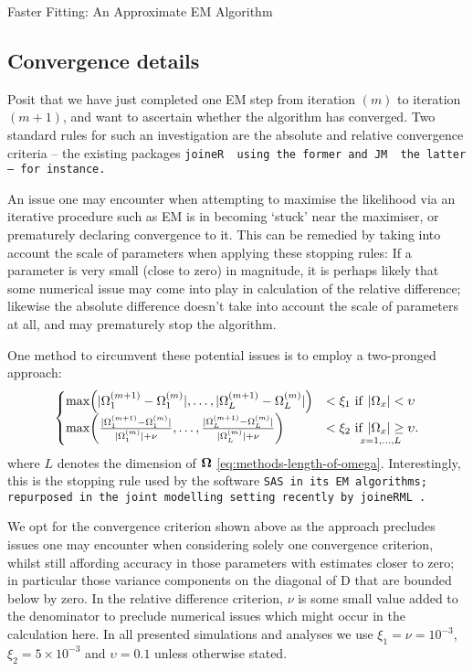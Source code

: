 \begin{chapter}{\label{cha:approx}Faster Fitting: An Approximate EM Algorithm}
  \subsection{Convergence details}\label{sec:approx-convcrit}
  Posit that we have just completed one EM step from iteration $(m)$ to iteration $(m+1)$, and want to ascertain whether the algorithm has converged. Two standard rules for such an investigation are the absolute and relative convergence criteria -- the existing packages \tt{joineR} \citep{R-joineR} using the former and \tt{JM} \citep{R-JM} the latter -- for instance. 
  
  An issue one may encounter when attempting to maximise the likelihood via an iterative procedure such as EM is in becoming `stuck' near the maximiser, or prematurely declaring convergence to it. This can be remedied by taking into account the scale of parameters when applying these stopping rules: If a parameter is very small (\ie close to zero) in magnitude, it is perhaps likely that some numerical issue may come into play in calculation of the relative difference; likewise the absolute difference doesn't take into account the scale of parameters at all, and may prematurely stop the algorithm.

  One method to circumvent these potential issues is to employ a two-pronged approach: 
  \begin{align}
    \begin{cases}
        \max\lb|\tobmp{\Omega}_1-\tobm{\Omega}_1|,\dots,|\tobmp{\Omega}_L-\tobm{\Omega}_L|\rb&<\xi_1\ \mathrm{if}\ |\Omega_x| < \upsilon \\
        \max\lb\frac{|\tobmp{\Omega}_1-\tobm{\Omega}_1|}{|\tobm{\Omega}_1|+\nu},\dots, 
               \frac{|\tobmp{\Omega}_L-\tobm{\Omega}_L|}{|\tobm{\Omega}_L|+\nu}\rb&<\xi_2\ \underset{\!\!\!\!\!x=1,\dots,L}{\mathrm{if}\ |\Omega_x|\ge\upsilon}.
    \end{cases}
    \label{eq:approx-convcrit}       
  \end{align}
  where $L$ denotes the dimension of $\bm{\mathrm{\Omega}}$ \eqref{eq:methods-length-of-omega}. Interestingly, this is the stopping rule used by the software \tt{SAS} in its EM algorithms; repurposed in the joint modelling setting recently by \tt{joineRML} \citep{Hickey2018}. 
  
  We opt for the convergence criterion shown above as the approach precludes issues one may encounter when considering solely one convergence criterion, whilst still affording accuracy in those parameters with estimates closer to zero; in particular those variance components on the diagonal of $\mathrm{D}$ that are bounded below by zero. In the relative difference criterion, $\nu$ is some small value added to the denominator to preclude numerical issues which might occur in the calculation here. In all presented simulations and analyses we use $\xi_1=\nu=10^{-3}$, $\xi_2 = 5\times10^{-3}$ and $\upsilon=0.1$ unless otherwise stated. 
 

\end{chapter}
